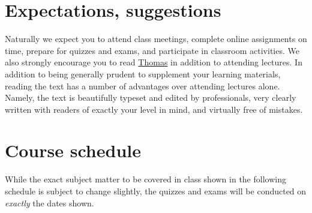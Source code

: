 \documentclass[11pt]{article}
\begin{document}
\section{Expectations, suggestions} Naturally we expect you to attend 
class meetings, complete online assignments on 
time, prepare for quizzes and exams, and participate in classroom 
activities. We also strongly encourage you to read
\href{http://wps.aw.com/aw_thomas_calculus_series}{Thomas}
in addition to attending lectures.
In addition to being generally prudent to 
supplement your learning materials, reading the text has a number of 
advantages over attending lectures alone. Namely, the text is beautifully 
typeset and edited by professionals, very clearly written with readers 
of exactly your level in mind, and virtually free of mistakes.

\section{Course schedule}\label{Schedule} While the exact subject
matter to be covered in class shown in the following schedule is
subject to change slightly, the quizzes and exams will be conducted
on {\em exactly} the dates shown.
\end{document}
